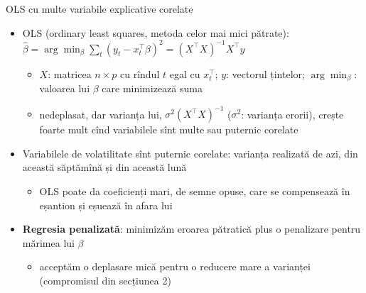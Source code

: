 \begin{frame}{OLS cu multe variabile explicative corelate}
\itemsize{\small}
\begin{itemize}
    \item OLS (ordinary least squares, metoda celor mai mici pătrate): $\hat\beta = \arg\min_\beta \sum_t (y_t - x_t^\top\beta)^2 = (X^\top X)^{-1}X^\top y$
    \begin{itemize}
        \item $X$: matricea $n \times p$ cu rîndul $t$ egal cu $x_t^\top$; $y$: vectorul țintelor; $\arg\min_\beta$: valoarea lui $\beta$ care minimizează suma
        \item nedeplasat, dar varianța lui, $\sigma^2(X^\top X)^{-1}$ ($\sigma^2$: varianța erorii), crește foarte mult cînd variabilele sînt multe sau puternic corelate
    \end{itemize}
    \item Variabilele de volatilitate sînt puternic corelate: varianța realizată de azi, din această săptămînă și din această lună
    \begin{itemize}
        \item OLS poate da coeficienți mari, de semne opuse, care se compensează în eșantion și eșuează în afara lui
    \end{itemize}
    \item \textbf{Regresia penalizată}: minimizăm eroarea pătratică plus o penalizare pentru mărimea lui $\beta$
    \begin{itemize}
        \item acceptăm o deplasare mică pentru o reducere mare a varianței (compromisul din secțiunea 2)
    \end{itemize}
\end{itemize}
\end{frame}

